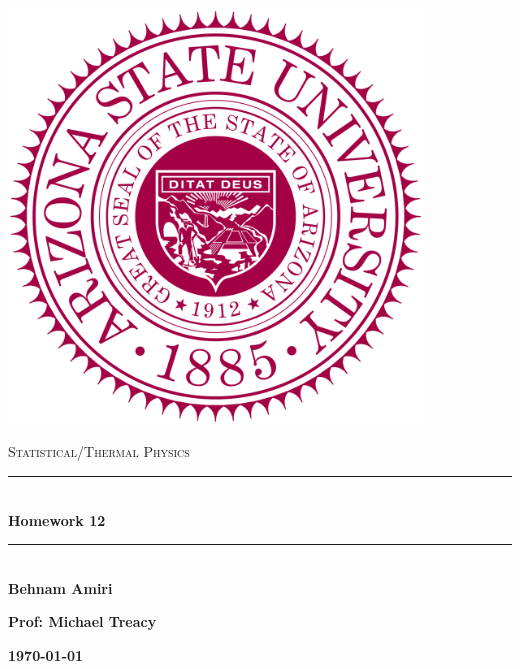 \documentclass[fleqn]{article}
\begin{document}
  \begin{titlepage}

    \newcommand{\HRule}{\rule{\linewidth}{0.5mm}}

    \center

    \begin{center}
      \includegraphics[height=11cm, width=11cm]{asu.png}
    \end{center}

    \vline

    \textsc{\LARGE Statistical/Thermal Physics}\\[1.5cm]

    \HRule \\[0.5cm]
    { \huge \bfseries Homework 12}\\[0.4cm] 
    \HRule \\[1.0cm]

    \textbf{Behnam Amiri}

    \bigbreak

    \textbf{Prof: Michael Treacy}

    \bigbreak

    \textbf{{\large \today}\\[2cm]}

    \vfill

  \end{titlepage}
\end{document}
